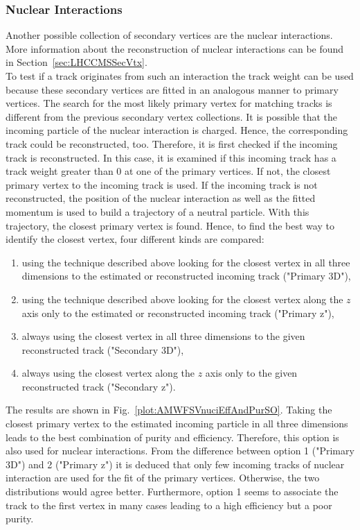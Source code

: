 \subsubsection{Nuclear Interactions \label{sec:AMWFSVni}}

Another possible collection of secondary vertices are the nuclear interactions. More information about the reconstruction of nuclear interactions can be found in Section~\ref{sec:LHCCMSSecVtx}. \\
To test if a track originates from such an interaction the track weight can be used because these secondary vertices are fitted in an analogous manner to primary vertices. The search for the most likely primary vertex for matching tracks is different from the previous secondary vertex collections. It is possible that the incoming particle of the nuclear interaction is charged. Hence, the corresponding track could be reconstructed, too. Therefore, it is first checked if the incoming track is reconstructed. In this case, it is examined if this incoming track has a track weight greater than 0 at one of the primary vertices. If not, the closest primary vertex to the incoming track is used. If the incoming track is not reconstructed, the position of the nuclear interaction as well as the fitted momentum is used to build a trajectory of a neutral particle. With this trajectory, the closest primary vertex is found. Hence, to find the best way to identify the closest vertex, four different kinds are compared:
\begin{enumerate}
    \item using the technique described above looking for the closest vertex in all three dimensions to the estimated or reconstructed incoming track ("Primary 3D"),
    \item using the technique described above looking for the closest vertex along the $z$ axis only to the estimated or reconstructed incoming track ("Primary z"),
    \item always using the closest vertex in all three dimensions to the given reconstructed track ("Secondary 3D"),
    \item always using the closest vertex along the $z$ axis only to the given reconstructed track ("Secondary z").
\end{enumerate}
The results are shown in Fig.~\ref{plot:AMWFSVnuciEffAndPurSO}. Taking the closest primary vertex to the estimated incoming particle in all three dimensions leads to the best combination of purity and efficiency. Therefore, this option is also used for nuclear interactions. From the difference between option 1 ("Primary 3D") and 2 ("Primary z") it is deduced that only few incoming tracks of nuclear interaction are used for the fit of the primary vertices. Otherwise, the two distributions would agree better. Furthermore, option 1 seems to associate the track to the first vertex in many cases leading to a high efficiency but a poor purity.

